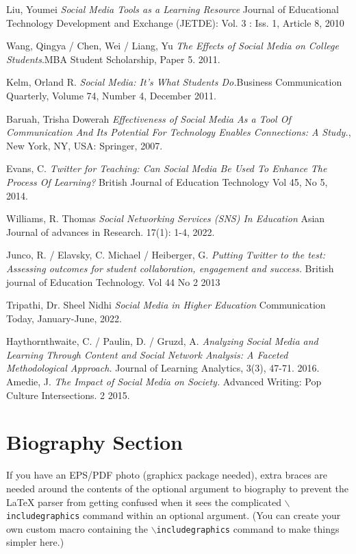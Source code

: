 \documentclass[lettersize,journal]{IEEEtran}
\begin{document}
\begin{thebibliography}{}


        Liu, Youmei {\it{Social Media Tools as a Learning Resource}} Journal of Educational Technology Development and Exchange (JETDE): Vol. 3 : Iss. 1, Article 8, 2010

        Wang, Qingya / Chen, Wei / Liang, Yu {\it{The Effects of Social Media on College Students}}.MBA Student Scholarship, Paper 5. 2011.

    Kelm, Orland R. {\it{Social Media: It's What Students Do.}}Business Communication Quarterly, Volume 74, Number 4, December 2011.

    Baruah, Trisha Dowerah {\it{Effectiveness of Social Media As a Tool Of Communication And Its Potential For Technology Enables Connections: A Study.}}, New York, NY, USA: Springer, 2007.

        Evans, C. {\it{Twitter for Teaching: Can Social Media Be Used To Enhance The Process Of Learning?}} British Journal of Education Technology
Vol 45, No 5, 2014.

        Williams, R. Thomas {\it{Social Networking Services (SNS) In Education}}
        Asian Journal of advances in Research. 17(1): 1-4, 2022.

        Junco, R. / Elavsky, C. Michael / Heiberger, G. {\it{Putting Twitter to
        the test: Assessing outcomes for student collaboration, engagement and
        success.}} British journal of Education Technology. Vol 44 No 2 2013

        Tripathi, Dr. Sheel Nidhi {\it{Social Media in Higher Education}}
        Communication Today, January-June, 2022.

    Haythornthwaite, C. / Paulin, D. / Gruzd, A. {\it{Analyzing Social Media
        and Learning Through Content and Social Network Analysis: A Faceted
        Methodological Approach.}} Journal of Learning Analytics, 3(3), 47-71.
        2016.
        Amedie, J. {\it{The Impact of Social Media on Society.}}
        Advanced Writing: Pop Culture Intersections. 2
        2015.
\end{thebibliography}

\newpage

\section{Biography Section}
If you have an EPS/PDF photo (graphicx package needed), extra braces are
 needed around the contents of the optional argument to biography to prevent
 the LaTeX parser from getting confused when it sees the complicated
 $\backslash${\tt{includegraphics}} command within an optional argument. (You can create
 your own custom macro containing the $\backslash${\tt{includegraphics}} command to make things
 simpler here.)
\end{document}
